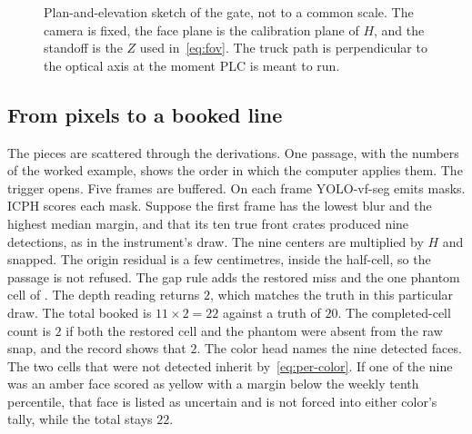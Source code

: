 \begin{figure}[t]
\centering
{}
\caption{Plan-and-elevation sketch of the gate, not to a common scale. The camera is fixed, the face plane is the calibration plane of $H$, and the standoff is the $Z$ used in~\eqref{eq:fov}. The truck path is perpendicular to the optical axis at the moment PLC is meant to run.}
\label{fig:gate}
\end{figure}

\subsection{From pixels to a booked line}
\label{sec:booked-line}

The pieces are scattered through the derivations. One passage, with the numbers of the worked example, shows the order in which the computer applies them. The trigger opens. Five frames are buffered. On each frame YOLO-vf-seg emits masks. ICPH scores each mask. Suppose the first frame has the lowest blur and the highest median margin, and that its ten true front crates produced nine detections, as in the instrument's draw. The nine centers are multiplied by $H$ and snapped. The origin residual is a few centimetres, inside the half-cell, so the passage is not refused. The gap rule adds the restored miss and the one phantom cell of . The depth reading returns $2$, which matches the truth in this particular draw. The total booked is $11\times 2=22$ against a truth of $20$. The completed-cell count is $2$ if both the restored cell and the phantom were absent from the raw snap, and the record shows that $2$. The color head names the nine detected faces. The two cells that were not detected inherit by~\eqref{eq:per-color}. If one of the nine was an amber face scored as yellow with a margin below the weekly tenth percentile, that face is listed as uncertain and is not forced into either color's tally, while the total stays $22$.

